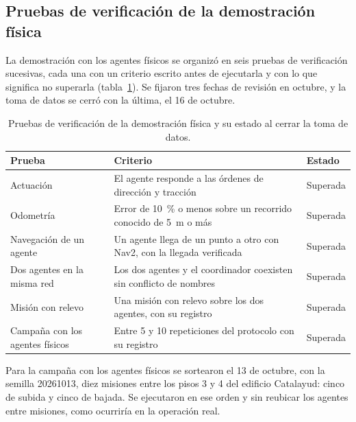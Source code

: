\subsection{Pruebas de verificación de la demostración física}
\label{sec:pruebas-verificacion}

La demostración con los agentes físicos se organizó en seis pruebas de verificación sucesivas, cada una con un criterio escrito antes de ejecutarla y con lo que significa no superarla (tabla~\ref{tab:pruebas-verificacion}). Se fijaron tres
fechas de revisión en octubre, y la toma de datos se cerró con la última, el 16 de octubre.

\begin{table}[H]
  \centering\small
  \caption{Pruebas de verificación de la demostración física y su estado al
    cerrar la toma de datos.}
  \label{tab:pruebas-verificacion}
  \begin{tabular}{@{}p{}p{}p{}@{}}
    \toprule
    \textbf{Prueba} & \textbf{Criterio} & \textbf{Estado} \\ \midrule
    Actuación & El agente responde a las órdenes de dirección y tracción & Superada \\ \addlinespace
    Odometría & Error de 10~\% o menos sobre un recorrido conocido de 5~m o más & Superada \\ \addlinespace
    Navegación de un agente & Un agente llega de un punto a otro con Nav2, con la llegada verificada & Superada \\ \addlinespace
    Dos agentes en la misma red & Los dos agentes y el coordinador coexisten sin conflicto de nombres & Superada \\ \addlinespace
    Misión con relevo & Una misión con relevo sobre los dos agentes, con su registro & Superada \\ \addlinespace
    Campaña con los agentes físicos & Entre 5 y 10 repeticiones del protocolo con su registro & Superada \\ \bottomrule
  \end{tabular}
\end{table}

Para la campaña con los agentes físicos se sortearon el 13 de octubre, con la semilla 20261013, diez misiones entre los pisos 3 y 4 del edificio Catalayud: cinco de subida y cinco de bajada. Se ejecutaron en ese orden y sin reubicar los agentes entre misiones, como ocurriría en la operación real.
